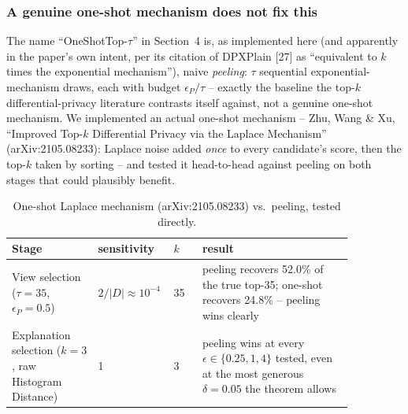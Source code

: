 \subsubsection{A genuine one-shot mechanism does not fix this}
\label{subsubsec:oneshot-test}

The name ``OneShotTop-$\tau$'' in Section~4 is, as implemented here (and
apparently in the paper's own intent, per its citation of DPXPlain [27]
as ``equivalent to $k$ times the exponential mechanism''), naive
\emph{peeling}: $\tau$ sequential exponential-mechanism draws, each with
budget $\epsilon_P/\tau$ -- exactly the baseline the top-$k$
differential-privacy literature contrasts itself against, not a genuine
one-shot mechanism. We implemented an actual one-shot mechanism -- Zhu,
Wang \& Xu, ``Improved Top-$k$ Differential Privacy via the Laplace
Mechanism'' (arXiv:2105.08233): Laplace noise added \emph{once} to every
candidate's score, then the top-$k$ taken by sorting -- and tested it
head-to-head against peeling on both stages that could plausibly benefit.

\begin{table}[t]
\centering
\small
\begin{tabular}{@{}p{0.24\linewidth}p{0.12\linewidth}p{0.08\linewidth}p{0.42\linewidth}@{}}
\toprule
Stage & sensitivity & $k$ & result \\
\midrule
View selection ($\tau{=}35$, $\epsilon_P{=}0.5$) & $2/|D|\approx10^{-4}$ & 35 & peeling recovers 52.0\% of the true top-35; one-shot recovers 24.8\% -- peeling wins clearly \\
Explanation selection ($k{=}3$, raw Histogram Distance) & 1 & 3 & peeling wins at every $\epsilon\in\{0.25,1,4\}$ tested, even at the most generous $\delta{=}0.05$ the theorem allows \\
\bottomrule
\end{tabular}
\caption{One-shot Laplace mechanism (arXiv:2105.08233) vs.\ peeling, tested directly.}
\label{tab:oneshot-test}
\end{table}

